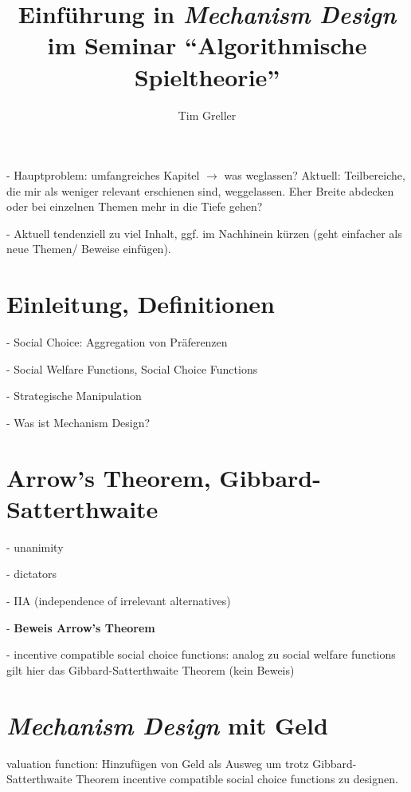 \documentclass[a4paper,11pt]{article}
\title{Einführung in \textit{Mechanism Design} \\ \Large im Seminar ``Algorithmische Spieltheorie''}
\author{Tim Greller}
\theoremstyle{definition}
\theoremstyle{plain}
\theoremstyle{definition}
\begin{document}
\maketitle

\setcounter{page}{0}
\fancyhead{}
\fancyhead[ER]{\leftmark}
\fancyhead[OL]{\rightmark}
\fancyhead[EL,OR]{\thepage}
\pagestyle{fancy}


- Hauptproblem: umfangreiches Kapitel $\rightarrow$ was weglassen? Aktuell: Teilbereiche, die mir als weniger relevant erschienen sind, weggelassen. Eher Breite abdecken oder bei einzelnen Themen mehr in die Tiefe gehen?

- Aktuell tendenziell zu viel Inhalt, ggf. im Nachhinein kürzen (geht einfacher als neue Themen/ Beweise einfügen).


\section{Einleitung, Definitionen}

- Social Choice: Aggregation von Präferenzen

- Social Welfare Functions, Social Choice Functions

- Strategische Manipulation

- Was ist Mechanism Design?


\section{Arrow's Theorem, Gibbard-Satterthwaite}

- unanimity

- dictators

- IIA (independence of irrelevant alternatives)

- \textbf{Beweis Arrow's Theorem}

- incentive compatible social choice functions: analog zu social welfare functions gilt hier das Gibbard-Satterthwaite Theorem (kein Beweis)


\section{\textit{Mechanism Design} mit Geld}
valuation function: Hinzufügen von Geld als Ausweg um trotz Gibbard-Satterthwaite Theorem incentive compatible social choice functions zu designen.
\end{document}
